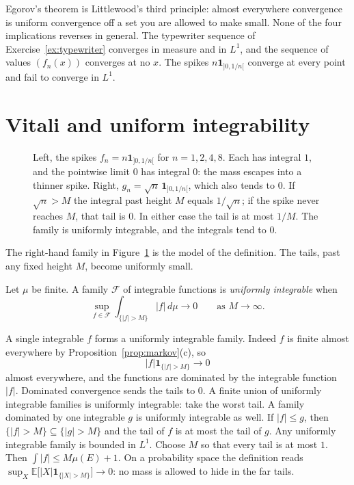 Egorov's theorem is Littlewood's third principle: almost everywhere convergence is uniform convergence off a set you are allowed to make small. None of the four implications reverses in general. The typewriter sequence of Exercise~\ref{ex:typewriter} converges in measure and in \(L^1\), and the sequence of values \((f_n(x))\) converges at no \(x\). The spikes \(n\mathbf 1_{]0,1/n[}\) converge at every point and fail to converge in \(L^1\).

\section{Vitali and uniform integrability}\label{sec:ui}

\begin{figure}[ht]
\centering
{}
\caption{Left, the spikes \(f_n=n\mathbf 1_{]0,1/n[}\) for \(n=1,2,4,8\). Each has integral \(1\), and the pointwise limit \(0\) has integral \(0\): the mass escapes into a thinner spike. Right, \(g_n=\sqrt n\,\mathbf 1_{]0,1/n[}\), which also tends to \(0\). If \(\sqrt n>M\) the integral past height \(M\) equals \(1/\sqrt n\); if the spike never reaches \(M\), that tail is \(0\). In either case the tail is at most \(1/M\). The family is uniformly integrable, and the integrals tend to \(0\).}
\label{fig:escape}
\end{figure}

The right-hand family in Figure~\ref{fig:escape} is the model of the definition. The tails, past any fixed height \(M\), become uniformly small.

\begin{definition}
Let \(\mu\) be finite. A family \(\mathcal F\) of integrable functions is \emph{uniformly integrable} when
\[\sup_{f\in\mathcal F}\int_{\{|f|>M\}}|f|\,d\mu\longrightarrow0\qquad\text{as }M\to\infty.\]
\end{definition}

A single integrable \(f\) forms a uniformly integrable family. Indeed \(f\) is finite almost everywhere by Proposition~\ref{prop:markov}(c), so
\[
|f|\mathbf 1_{\{|f|>M\}}\to0
\]
almost everywhere, and the functions are dominated by the integrable function \(|f|\). Dominated convergence sends the tails to \(0\). A finite union of uniformly integrable families is uniformly integrable: take the worst tail. A family dominated by one integrable \(g\) is uniformly integrable as well. If \(|f|\le g\), then \(\{|f|>M\}\subseteq\{|g|>M\}\) and the tail of \(f\) is at most the tail of \(g\). Any uniformly integrable family is bounded in \(L^1\). Choose \(M\) so that every tail is at most \(1\). Then \(\int|f|\le M\mu(E)+1\). On a probability space the definition reads \(\sup_X\mathbb E\bigl[|X|\mathbf 1_{\{|X|>M\}}\bigr]\to0\): no mass is allowed to hide in the far tails.

